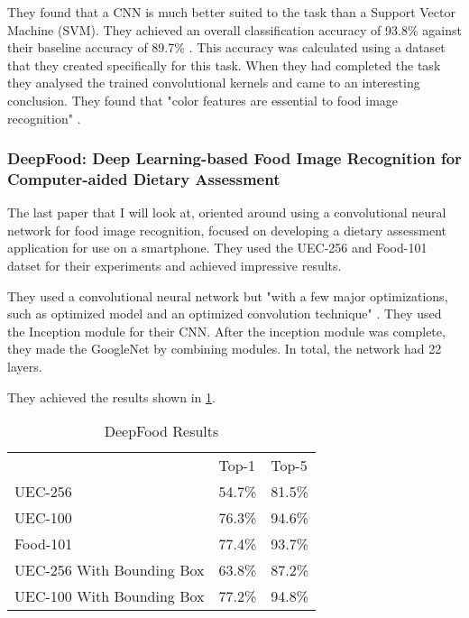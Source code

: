 They found that a CNN is much better suited to the task than a Support Vector
Machine (SVM). They achieved an overall classification accuracy of 93.8\%
against their baseline accuracy of 89.7\% \textcite{kagayaFood}. This accuracy
was calculated using a dataset that they created specifically for this task.
When they had completed the task they analysed the trained convolutional kernels
and came to an interesting conclusion. They found that "color features are
essential to food image recognition" \textcite{kagayaFood}.

\subsubsection{DeepFood: Deep Learning-based Food Image Recognition for
Computer-aided Dietary Assessment}
The last paper that I will look at, oriented around using a convolutional neural
network for food image recognition, focused on developing a dietary assessment
application for use on a smartphone. They used the UEC-256 and Food-101 datset
for their experiments and achieved impressive results.

They used a convolutional neural network but "with a few major optimizations,
such as optimized model and an optimized convolution technique"
\textcite{deepFood}. They used the Inception module for their CNN. After the
inception module was complete, they made the GoogleNet by combining modules. In
total, the network had 22 layers.

They achieved the results shown in \ref{resultsDeepFood}.

\begin{table}[]
	\centering
	\caption{DeepFood Results}
	\label{resultsDeepFood}
	\begin{tabular}{lll}
		                          & Top-1  & Top-5  \\
								  UEC-256                   & 54.7\% & 81.5\% \\
								  UEC-100                   & 76.3\% & 94.6\% \\
								  Food-101                  & 77.4\% & 93.7\% \\
								  UEC-256 With Bounding Box & 63.8\% & 87.2\% \\
								  UEC-100 With Bounding Box & 77.2\% & 94.8\%
	\end{tabular}
\end{table}

